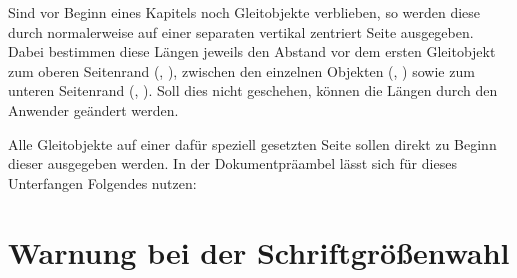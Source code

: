 \begin{Declaration}
  {}
\begin{Declaration}
  {}
\begin{Declaration}
  {}
\begin{Declaration}
  {}
\begin{Declaration}
  {}
\begin{Declaration}
  {}
\printdeclarationlist[Längen]

Sind vor Beginn eines Kapitels noch Gleitobjekte verblieben, so werden diese 
durch  normalerweise auf einer separaten vertikal zentriert Seite 
ausgegeben. Dabei bestimmen diese Längen jeweils den Abstand vor dem ersten 
Gleitobjekt zum oberen Seitenrand (, ), 
zwischen den einzelnen Objekten (, ) sowie 
zum unteren Seitenrand (, ). Soll dies nicht 
geschehen, können die Längen durch den Anwender geändert werden.
\end{Declaration}
\end{Declaration}
\end{Declaration}
\end{Declaration}
\end{Declaration}
\end{Declaration}
%
\begin{Example}
Alle Gleitobjekte auf einer dafür speziell gesetzten Seite sollen direkt zu 
Beginn dieser ausgegeben werden. In der Dokumentpräambel lässt sich für dieses 
Unterfangen Folgendes nutzen:
\begin{Code}
\makeatletter
\setlength{\@fptop}{0pt}
\setlength{\@dblfptop}{0pt}%
\makeatother
\end{Code}
\end{Example}



\section{%
  Warnung bei der Schriftgrößenwahl%
  \label{sec:tips:fontsize}%
}

